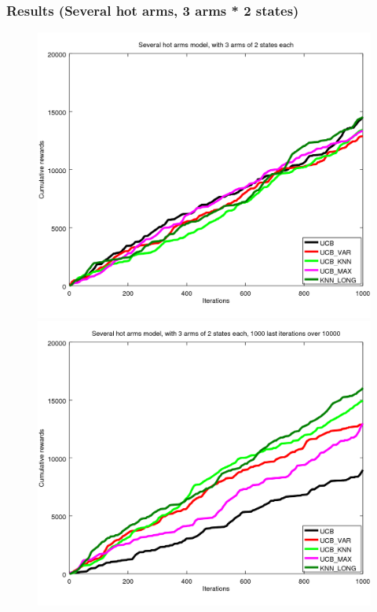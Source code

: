 \documentclass[french]{beamer}
\begin{document}
\begin{frame}
	\frametitle{Results (Several hot arms, 3 arms * 2 states)}

	\begin{figure}[h]
		\begin{minipage}[b]{.49\linewidth}
			\includegraphics[width=1.0\textwidth]{begin_m_1000it.png}

		\end{minipage}
		\hfill
		\begin{minipage}[b]{0.49\linewidth}
			\includegraphics[width=1.0\textwidth]{last_m_1000it.png}

		\end{minipage}
		\label{fig:f}
	\end{figure}
\end{frame}
\end{document}
